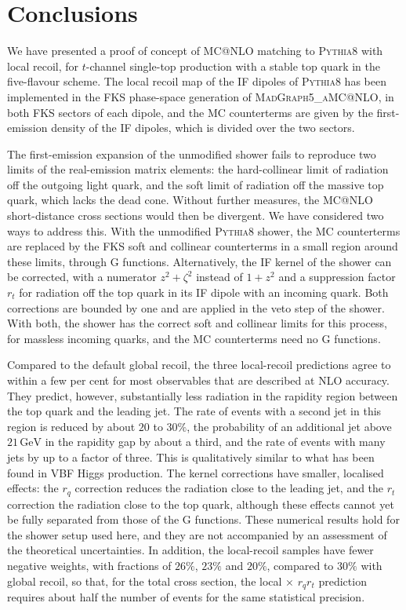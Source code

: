 \documentclass[a4paper,11pt]{article}
\makeatletter
\newcommand{\GeV}{\ensuremath{\,\text{GeV}}}
\newcommand{\mgamc}{\textsc{MadGraph5\_aMC@NLO}\xspace}
\newcommand{\mcatnlo}{MC@NLO\xspace}
\newcommand{\pythia}{\textsc{Pythia8}\xspace}
\newcommand{\locqt}{local$\,{\times}\,r_qr_t$\xspace}
\makeatother
\begin{document}
\section{Conclusions}
\label{sec:conclusions}

We have presented a proof of concept of \mcatnlo matching to \pythia
with local recoil, for $t$-channel single-top production with a stable
top quark in the five-flavour scheme. The local recoil map of the IF
dipoles of \pythia has been implemented in the FKS phase-space
generation of \mgamc, in both FKS sectors of each dipole, and the MC
counterterms are given by the first-emission density of the IF
dipoles, which is divided over the two sectors.

The first-emission expansion of the unmodified shower fails to
reproduce two limits of the real-emission matrix elements: the
hard-collinear limit of radiation off the outgoing light quark, and
the soft limit of radiation off the massive top quark, which lacks
the dead cone. Without further measures, the \mcatnlo short-distance
cross sections would then be divergent. We have considered two ways to
address this. With the unmodified \pythia shower, the MC counterterms
are replaced by the FKS soft and collinear counterterms in a small
region around these limits, through G functions. Alternatively, the
IF kernel of the shower can be corrected, with a numerator
$z^2+\zeta^2$ instead of $1+z^2$ and a suppression factor $r_t$ for
radiation off the top quark in its IF dipole with an incoming quark.
Both corrections are bounded by one and are applied in the veto step
of the shower. With both, the shower has the correct soft and
collinear limits for this process, for massless incoming quarks, and
the MC counterterms need no G functions.

Compared to the default global recoil, the three local-recoil
predictions agree to within a few per cent for most observables that
are described at NLO accuracy. They predict, however, substantially
less radiation in the rapidity region between the top quark and the
leading jet. The rate of events with a second jet in this region is
reduced by about $20$ to $30\%$, the probability of an additional jet
above $21\GeV$ in the rapidity gap by about a third, and the rate of
events with many jets by up to a factor of three. This is
qualitatively similar to what has been found in VBF Higgs production.
The kernel corrections have smaller, localised effects: the $r_q$
correction reduces the radiation close to the leading jet, and the
$r_t$ correction the radiation close to the top quark, although these
effects cannot yet be fully separated from those of the G functions.
These numerical results hold for the shower setup used here, and they
are not accompanied by an assessment of the theoretical
uncertainties. In addition, the local-recoil samples have fewer
negative weights, with fractions of $26\%$, $23\%$ and $20\%$,
compared to $30\%$ with global recoil, so that, for the total cross
section, the \locqt prediction requires about half the number of
events for the same statistical precision.
\end{document}
